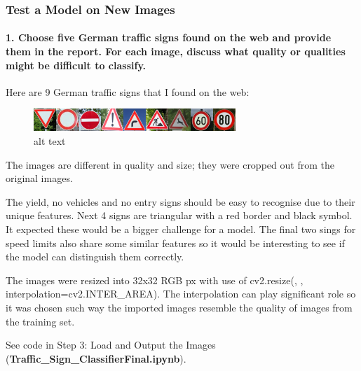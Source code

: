 \documentclass[11pt]{article}
\makeatletter
\def\maxwidth{\ifdim\Gin@nat@width>\linewidth\linewidth
    \else\Gin@nat@width\fi}
\let\Oldincludegraphics\includegraphics
\renewcommand{\includegraphics}[1]{\Oldincludegraphics[width=.8\maxwidth]{#1}}
\makeatother
\begin{document}
\hypertarget{test-a-model-on-new-images}{%
\subsubsection{Test a Model on New
Images}\label{test-a-model-on-new-images}}

\hypertarget{choose-five-german-traffic-signs-found-on-the-web-and-provide-them-in-the-report.-for-each-image-discuss-what-quality-or-qualities-might-be-difficult-to-classify.}{%
\paragraph{1. Choose five German traffic signs found on the web and
provide them in the report. For each image, discuss what quality or
qualities might be difficult to
classify.}\label{choose-five-german-traffic-signs-found-on-the-web-and-provide-them-in-the-report.-for-each-image-discuss-what-quality-or-qualities-might-be-difficult-to-classify.}}

Here are 9 German traffic signs that I found on the web:

\begin{figure}
\centering
\includegraphics{./images/testsigns.png}
\caption{alt text}
\end{figure}

The images are different in quality and size; they were cropped out from
the original images.

The yield, no vehicles and no entry signs should be easy to recognise
due to their unique features. Next 4 signs are triangular with a red
border and black symbol. It expected these would be a bigger challenge
for a model. The final two sings for speed limits also share some
similar features so it would be interesting to see if the model can
distinguish them correctly.

The images were resized into 32x32 RGB px with use of cv2.resize(, ,
interpolation=cv2.INTER\_AREA). The interpolation can play significant
role so it was chosen such way the imported images resemble the quality
of images from the training set.

See code in Step 3: Load and Output the Images
(\textbf{Traffic\_Sign\_ClassifierFinal.ipynb}).
\end{document}
